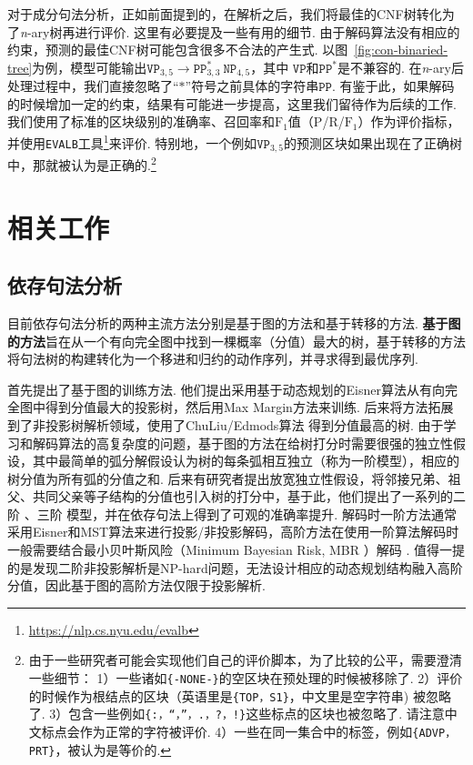 对于成分句法分析，正如前面提到的，在解析之后，我们将最佳的CNF树转化为了\textit{n}-ary树再进行评价.
这里有必要提及一些有用的细节.
由于解码算法没有相应的约束，预测的最佳CNF树可能包含很多不合法的产生式.
以图~\ref{fig:con-binaried-tree}为例，模型可能输出$\texttt{VP}_{3,5} \rightarrow \texttt{PP}^{\ast}_{3,3} ~ \texttt{NP}_{4,5}$，其中 $\texttt{VP}$和$\texttt{PP}^{\ast}$是不兼容的.
在\textit{n}-ary后处理过程中，我们直接忽略了``$\mathtt{\ast}$''符号之前具体的字符串$\texttt{PP}$.
有鉴于此，如果解码的时候增加一定的约束，结果有可能进一步提高，这里我们留待作为后续的工作.
我们使用了标准的区块级别的准确率、召回率和$\mathrm{F}_1$值（$\mathrm{P}$/$\mathrm{R}$/$\mathrm{F}_1$）作为评价指标，并使用\texttt{EVALB}工具\footnote{\url{https://nlp.cs.nyu.edu/evalb}}来评价.
特别地，一个例如$\texttt{VP}_{3,5}$的预测区块如果出现在了正确树中，那就被认为是正确的.\footnote{
  由于一些研究者可能会实现他们自己的评价脚本，为了比较的公平，需要澄清一些细节：
  1）一些诸如\texttt{\{-NONE-\}}的空区块在预处理的时候被移除了.
  2）评价的时候作为根结点的区块（英语里是\texttt{\{TOP，S1\}}，中文里是空字符串) 被忽略了.
  3）包含一些例如\texttt{\{:，``，''，.，?，!\}}这些标点的区块也被忽略了.
  请注意中文标点会作为正常的字符被评价.
  4）一些在同一集合中的标签，例如\texttt{\{ADVP，PRT\}}，被认为是等价的.}

\section{相关工作}
\label{sec:relworks}

\subsection{依存句法分析}

目前依存句法分析的两种主流方法分别是基于图的方法和基于转移的方法.
\textbf{基于图的方法}旨在从一个有向完全图中找到一棵概率（分值）最大的树，基于转移的方法将句法树的构建转化为一个移进和归约的动作序列，并寻求得到最优序列.

\citet{mcdonald-etal-2005-online}首先提出了基于图的训练方法.
他们提出采用基于动态规划的Eisner算法从有向完全图中得到分值最大的投影树，然后用Max Margin方法来训练.
后来\citet{mcdonald-etal-2005-non}将方法拓展到了非投影树解析领域，使用了ChuLiu/Edmods算法 \citep{chu-1965-shortest}得到分值最高的树.
由于学习和解码算法的高复杂度的问题，基于图的方法在给树打分时需要很强的独立性假设，其中最简单的弧分解假设认为树的每条弧相互独立（称为一阶模型），相应的树分值为所有弧的分值之和.
后来有研究者提出放宽独立性假设，将邻接兄弟、祖父、共同父亲等子结构的分值也引入树的打分中，基于此，他们提出了一系列的二阶 \citep{mcdonald-pereira-2006-online,carreras-2007-experiments}、三阶 \citep{koo-collins-2010-efficient}模型，并在依存句法上得到了可观的准确率提升.
解码时一阶方法通常采用Eisner和MST算法来进行投影/非投影解码，高阶方法在使用一阶算法解码时一般需要结合最小贝叶斯风险（Minimum Bayesian Risk, MBR ）解码 \citep{smith-smith-2007-probabilistic}.
值得一提的是\citet{mcdonald-pereira-2006-online}发现二阶非投影解析是NP-hard问题，无法设计相应的动态规划结构融入高阶分值，因此基于图的高阶方法仅限于投影解析.

